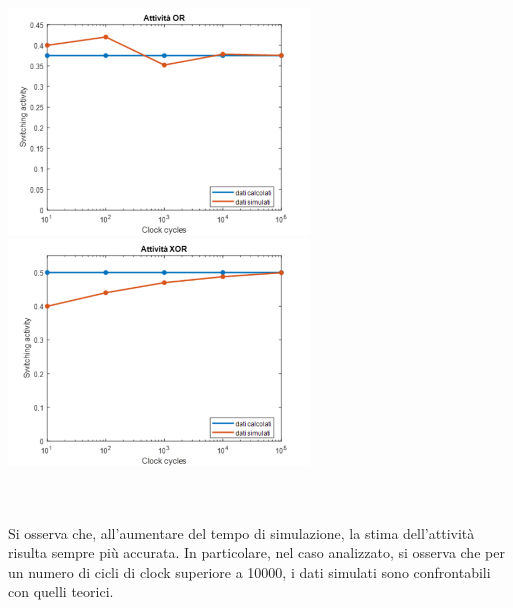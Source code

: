 \documentclass[11pt,  english, makeidx, a4paper, titlepage, oneside]{book}
\begin{document}
\centerline{\includegraphics[width=8cm]{./img/Lab_1/Es_1/OR.png}
            \includegraphics[width=8cm]{./img/Lab_1/Es_1/XOR.png}}
\\\\
Si osserva che, all'aumentare del tempo di simulazione, la stima 
dell'attività risulta sempre più accurata. In particolare, 
nel caso analizzato, si osserva che per un numero di cicli di clock 
superiore a 10000, i dati simulati sono confrontabili con quelli teorici.
\newpage
\end{document}
